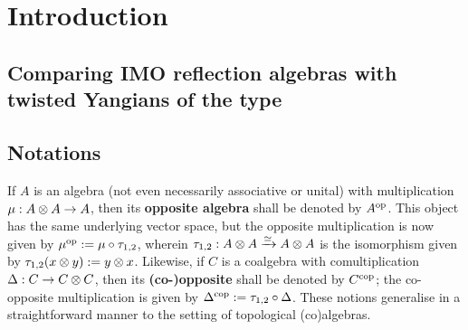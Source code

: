 \section{Introduction}
    \subsection{Comparing IMO reflection algebras with twisted Yangians of the type }

    \subsection{Notations}
        If $A$ is an algebra (not even necessarily associative or unital) with multiplication $\mu: A \tensor A \to A$, then its \textbf{opposite algebra} shall be denoted by $A^{\mathrm{op}}$. This object has the same underlying vector space, but the opposite multiplication is now given by $\mu^{\mathrm{op}} := \mu \circ \tau_{1, 2}$, wherein $\tau_{1, 2}: A \tensor A \xrightarrow[]{\cong} A \tensor A$ is the isomorphism given by $\tau_{1, 2}(x \tensor y) := y \tensor x$. Likewise, if $C$ is a coalgebra with comultiplication $\Delta: C \to C \tensor C$, then its \textbf{(co-)opposite} shall be denoted by $C^{\mathrm{cop}}$; the co-opposite multiplication is given by $\Delta^{\mathrm{cop}} := \tau_{1, 2} \circ \Delta$. These notions generalise in a straightforward manner to the setting of topological (co)algebras.